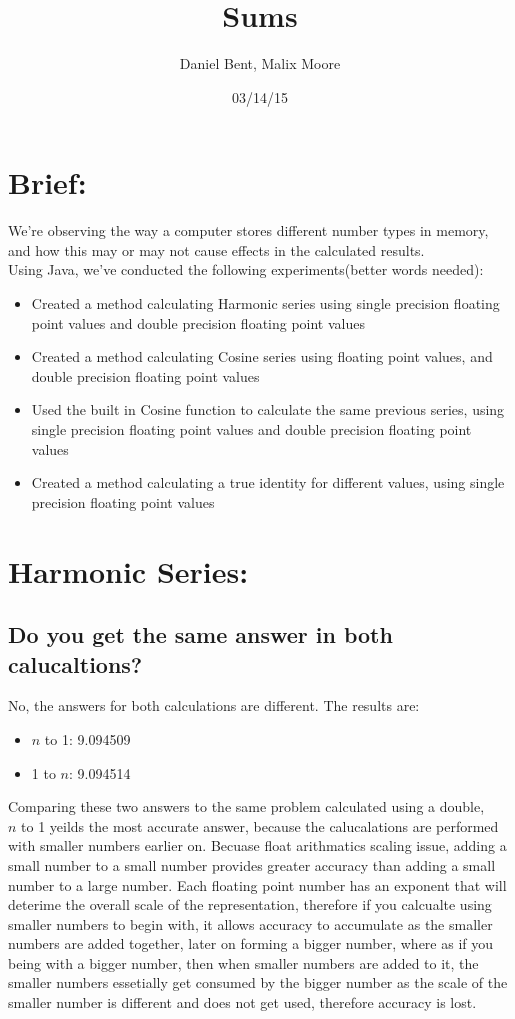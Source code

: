 \documentclass[12pt]{article}
\title{Sums}
\author{Daniel Bent, Malix Moore}
\date{03/14/15}
\begin{document}
\maketitle

\section*{Brief:}
We’re observing the way a computer stores different number types in memory, and how this may or may not cause effects in the calculated results.\\
Using Java, we’ve conducted the following experiments(better words needed):

\begin{itemize}
  \item Created a method calculating Harmonic series using single precision floating point values and double precision floating point values
  \item Created a method calculating Cosine series using floating point values, and double precision floating point values
  \item Used the built in Cosine function to calculate the same previous series, using single precision floating point values and double precision floating point values
  \item Created a method calculating a true identity for different values, using single precision floating point values
\end{itemize}

\section*{Harmonic Series:}
\begin{itemize}
\subsection*{Do you get the same answer in both calucaltions?}
\end{itemize}
\item No, the answers for both calculations are different. The results are:
\begin{itemize}
\item $n$ to 1: 9.094509
\item 1 to $n$: 9.094514
\end{itemize}
\item Comparing these two answers to the same problem calculated using a double,\\  $n$ to 1 yeilds the most accurate answer, because the calucalations are performed with smaller numbers earlier on. Becuase float arithmatics scaling issue, adding a small number to a small number provides greater accuracy than adding a small number to a large number. Each floating point number has an exponent that will deterime the overall scale of the representation, therefore if you calcualte using smaller numbers to begin with, it allows accuracy to accumulate as the smaller numbers are added together, later on forming a bigger number, where as if you being with a bigger number, then when smaller numbers are added to it, the smaller numbers essetially get consumed by the bigger number as the scale of the smaller number is different and does not get used, therefore accuracy is lost.
\end{document}
